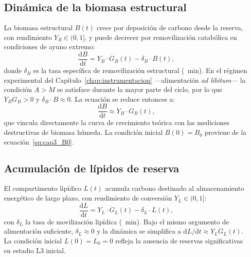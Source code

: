 \subsection{Dinámica de la biomasa estructural}
\label{subsec:cap3_ode_biomasa}

La biomasa estructural $B(t)$ crece por deposición de carbono desde la reserva, con rendimiento $Y_B \in (0,1]$, y puede decrecer por removilización catabólica en condiciones de ayuno extremo:
\begin{equation}
    \frac{\mathrm{d}B}{\mathrm{d}t} = Y_B \cdot \dot{G}_B(t) - \delta_B \cdot B(t),
    \label{eq:cap3_ode_biomasa_general}
\end{equation}
donde $\delta_B$ es la tasa específica de removilización estructural (\si{\per\minute}). En el régimen experimental del Capítulo~\ref{chap:instrumentacion} ---alimentación \emph{ad libitum}--- la condición $\dot{A} > \dot{M}$ se satisface durante la mayor parte del ciclo, por lo que $Y_B\dot{G}_B > 0$ y $\delta_B \cdot B \approx 0$. La ecuación se reduce entonces a:
\begin{equation}
    \frac{\mathrm{d}B}{\mathrm{d}t} \approx Y_B \cdot \dot{G}_B(t),
    \label{eq:cap3_ode_biomasa}
\end{equation}
que vincula directamente la curva de crecimiento teórica con las mediciones destructivas de biomasa húmeda. La condición inicial $B(0) = B_0$ proviene de la ecuación~\eqref{eq:cap3_B0}.

\subsection{Acumulación de lípidos de reserva}
\label{subsec:cap3_ode_lipidos}

El compartimento lipídico $L(t)$ acumula carbono destinado al almacenamiento energético de largo plazo, con rendimiento de conversión $Y_L \in (0,1]$:
\begin{equation}
    \frac{\mathrm{d}L}{\mathrm{d}t} = Y_L \cdot \dot{G}_L(t) - \delta_L \cdot L(t),
    \label{eq:cap3_ode_lipidos_general}
\end{equation}
con $\delta_L$ la tasa de movilización lipídica (\si{\per\minute}). Bajo el mismo argumento de alimentación suficiente, $\delta_L \approx 0$ y la dinámica se simplifica a $\mathrm{d}L/\mathrm{d}t \approx Y_L\dot{G}_L(t)$. La condición inicial $L(0) = L_0 = 0$ refleja la ausencia de reservas significativas en estadio L3 inicial.


